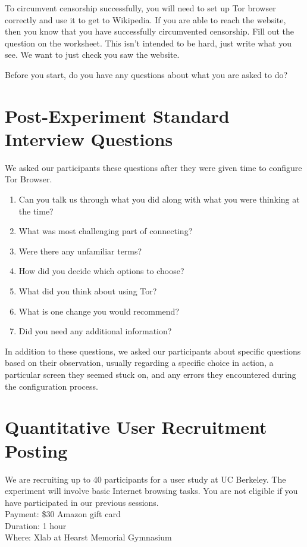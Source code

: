 \documentclass{template}
\begin{document}
To circumvent censorship successfully, you will need to set up Tor browser correctly and use it to get to Wikipedia. If you are able to reach the website, then you know that you have successfully circumvented censorship. Fill out the question on the worksheet. This isn’t intended to be hard, just write what you see. We want to just check you saw the website. 

Before you start, do you have any questions about what you are asked to do? 

\section{Post-Experiment Standard Interview Questions}
We asked our participants these questions after they were given time to configure Tor Browser. 

\begin{enumerate} \itemsep1pt \parskip0pt  
\item{Can you talk us through what you did along with what you were thinking at the time?}
\item{What was most challenging part of connecting?}
\item{Were there any unfamiliar terms?}
\item{How did you decide which options to choose?}
\item{What did you think about using Tor?}
\item{What is one change you would recommend?} 
\item{Did you need any additional information?} 
\end{enumerate}  

In addition to these questions, we asked our participants about specific questions based on their observation, usually regarding a specific choice in action, a particular screen they seemed stuck on, and any errors they encountered during the configuration process. 

\section{Quantitative User Recruitment Posting}
\label{quantitative-recruitment}
We are recruiting up to 40 participants for a user study at UC Berkeley. The experiment will involve basic Internet browsing tasks. You are not eligible if you have participated in our previous sessions.\\

\indent Payment: \$30 Amazon gift card\\
\indent Duration: 1 hour \\
\indent Where: Xlab at Hearst Memorial Gymnasium\\
\end{document}
